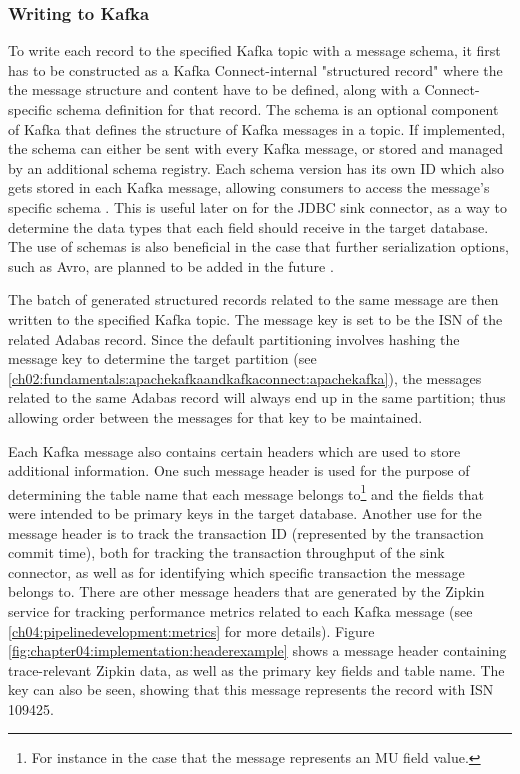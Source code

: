 \subsubsection{Writing to Kafka} 
To write each record to the specified Kafka topic with a message schema, it first has to be constructed as a Kafka Connect-internal "structured record" where the the message structure and content have to be defined, along with a Connect-specific schema definition for that record. The schema is an optional component of Kafka that defines the structure of Kafka messages in a topic. If implemented, the schema can either be sent with every Kafka message, or stored and managed by an additional schema registry. Each schema version has its own ID which also gets stored in each Kafka message, allowing consumers to access the message's specific schema \cite{kafkadatabaseinverted}. This is useful later on for the \ac{JDBC} sink connector, as a way to determine the data types that each field should receive in the target database. The use of schemas is also beneficial in the case that further serialization options, such as Avro, are planned to be added in the future \cite{kreps2011kafka}.

The batch of generated structured records related to the same message are then written to the specified Kafka topic. The message key is set to be the \ac{ISN} of the related Adabas record. Since the default partitioning involves hashing the message key to determine the target partition (see \ref{ch02:fundamentals:apachekafkaandkafkaconnect:apachekafka}), the messages related to the same Adabas record will always end up in the same partition; thus allowing order between the messages for that key to be maintained.

Each Kafka message also contains certain headers which are used to store additional information. One such message header is used for the purpose of determining the table name that each message belongs to\footnote{For instance in the case that the message represents an MU field value.} and the fields that were intended to be primary keys in the target database. Another use for the message header is to track the transaction ID (represented by the transaction commit time), both for tracking the transaction throughput of the sink connector, as well as for identifying which specific transaction the message belongs to. There are other message headers that are generated by the Zipkin service for tracking performance metrics related to each Kafka message (see \ref{ch04:pipelinedevelopment:metrics} for more details). Figure \ref{fig:chapter04:implementation:headerexample} shows a message header containing trace-relevant Zipkin data, as well as the primary key fields and table name. The key can also be seen, showing that this message represents the record with \ac{ISN} 109425.

